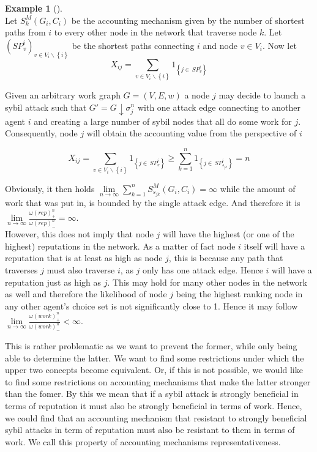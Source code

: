 \documentclass[11pt,a4paper]{article}
\theoremstyle{definition}
\theoremstyle{theorem}
\theoremstyle{proposition}
\theoremstyle{corollary}
\theoremstyle{lemma}
\theoremstyle{example}
\newtheorem{example}{Example}[section]
\theoremstyle{remark}
\begin{document}
\begin{example}[]\ \\
Let $S^M_k(G_i,C_i)$ be the accounting mechanism given by the number of shortest paths from $i$ to every other node in the network that traverse node $k$. Let $(SP^i_v)_{v\in{}V_i\backslash{}\left\lbrace{}i\right\rbrace}$ be the shortest paths connecting $i$ and node $v\in{}V_i$. Now let 
\[
X_{ij}=\sum\limits_{v\in{}V_i\backslash\left\lbrace{}i\right\rbrace}1_{\left\lbrace{}j\in{}\,SP^i_v\right\rbrace}
\]

\noindent{}Given an arbitrary work graph $G=(V,E,w)$ a node $j$ may decide to launch a sybil attack such that $G'=G\downarrow\sigma^n_j$ with one attack edge connecting to another agent $i$ and creating a large number of sybil nodes that all do some work for $j$. Consequently, node $j$ will obtain the accounting value from the perspective of $i$ 

\[
X_{ij}=\sum\limits_{v\in{}V_i\backslash\left\lbrace{}i\right\rbrace}1_{\left\lbrace{}j\in{}\,SP^i_v\right\rbrace} \geq \sum\limits_{k=1}^{n}1_{\left\lbrace{}j\in{}\,SP^i_{s_{jk}}\right\rbrace} = n
\]

\noindent{}Obviously, it then holds $\lim\limits_{n\rightarrow\infty}\sum\limits_{k=1}^{n}S^M_{s_{jk}}(G_i,C_i)=\infty$ while the amount of work that was put in, is bounded by the single attack edge. And therefore it is $\lim\limits_{n\rightarrow\infty}\frac{\omega(rep)^n_{+}}{\omega(rep)^n_{-}}=\infty.$ \vspace{1em}\\

\noindent{}However, this does not imply that node $j$ will have the highest (or one of the highest) reputations in the network. As a matter of fact node $i$ itself will have a reputation that is at least as high as node $j$, this is because any path that traverses $j$ must also traverse $i$, as $j$ only has one attack edge. Hence $i$ will have a reputation just as high as $j$. This may hold for many other nodes in the network as well and therefore the likelihood of node $j$ being the highest ranking node in any other agent's choice set is not significantly close to 1. Hence it may follow $\lim\limits_{n\rightarrow\infty}\frac{\omega(work)^n_{+}}{\omega(work)^n_{-}}<\infty$.
\end{example}

\noindent{}This is rather problematic as we want to prevent the former, while only being able to determine the latter. We want to find some restrictions under which the upper two concepts become equivalent. Or, if this is not possible, we would like to find some restrictions on accounting mechanisms that make the latter stronger than the fomer. By this we mean that if a sybil attack is strongly beneficial in terms of reputation it must also be strongly beneficial in terms of work. Hence, we could find that an accounting mechanism that resistant to strongly beneficial sybil attacks in term of reputation must also be resistant to them in terms of work. We call this property of accounting mechanisms representativeness. \vspace{1em}\\
\end{document}
